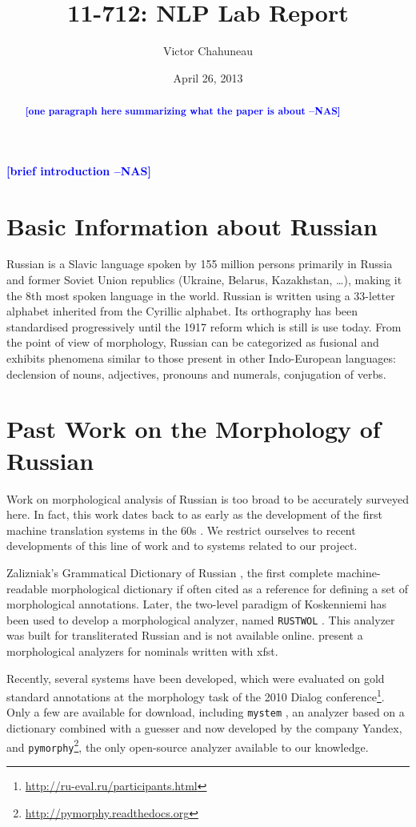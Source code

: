 \documentclass[11pt,letterpaper]{article}
\title{11-712:  NLP Lab Report}
\author{Victor Chahuneau}
\date{April 26, 2013}
\newcommand{\nascomment}[1]{\textcolor{blue}{\textbf{[#1 --NAS]}}}
\begin{document}
\maketitle
\begin{abstract}
\nascomment{one paragraph here summarizing what the paper is about}
\end{abstract}

\nascomment{brief introduction}

\section{Basic Information about Russian}
Russian is a Slavic language spoken by 155 million persons primarily in Russia and former Soviet Union republics (Ukraine, Belarus, Kazakhstan, \ldots), making it the 8th most spoken language in the world. Russian is written using a 33-letter alphabet inherited from the Cyrillic alphabet. Its orthography has been standardised progressively until the 1917 reform which is still is use today. From the point of view of morphology, Russian can be categorized as fusional and exhibits phenomena similar to those present in other Indo-European languages: declension of nouns, adjectives, pronouns and numerals, conjugation of verbs.

\section{Past Work on the Morphology of Russian}

Work on morphological analysis of Russian is too broad to be accurately surveyed here. In fact, this work dates back to as early as the development of the first machine translation systems in the 60s \cite{nikolaeva}. We restrict ourselves to recent developments of this line of work and to systems related to our project.

Zalizniak's Grammatical Dictionary of Russian \cite{zalizniak}, the first complete machine-readable morphological dictionary if often cited as a reference for defining a set of morphological annotations. Later, the two-level paradigm of Koskenniemi has been used to develop a morphological analyzer, named \texttt{RUSTWOL} \cite{vilkki}. This analyzer was built for transliterated Russian and is not available online. \cite{bilan} present a morphological analyzers for nominals written with xfst.

Recently, several systems have been developed, which were evaluated on gold standard annotations at the morphology task of the 2010 Dialog conference\footnote{\url{http://ru-eval.ru/participants.html}}. Only a few are available for download, including \texttt{mystem} \cite{mystem}, an analyzer based on a dictionary combined with a guesser and now developed by the company Yandex, and \texttt{pymorphy}\footnote{\url{http://pymorphy.readthedocs.org}}, the only open-source analyzer available to our knowledge.
\end{document}
